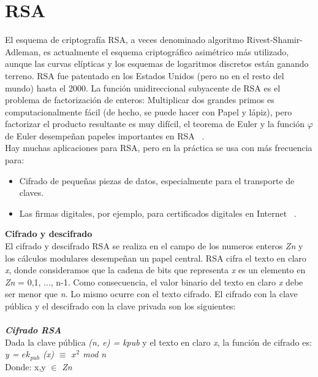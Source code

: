 

\section{RSA}

El esquema de criptografía RSA, a veces denominado algoritmo Rivest-Shamir-Adleman, es actualmente el esquema criptográfico asimétrico más utilizado, aunque las curvas elípticas y los esquemas de logaritmos discretos están ganando terreno. RSA fue patentado en los Estados Unidos (pero no en el resto del mundo) hasta el 2000. La función unidireccional subyacente de RSA es el problema de factorización de enteros: Multiplicar dos grandes primos es computacionalmente fácil (de hecho, se puede hacer con
Papel y lápiz), pero factorizar el producto resultante es muy difícil, el teorema de Euler y la función $\varphi$ de Euler desempeñan papeles importantes en RSA ~\cite{paar}.
\\
Hay muchas aplicaciones para RSA, pero en la práctica se usa con más frecuencia para:

	\begin{itemize}
		\item Cifrado de pequeñas piezas de datos, especialmente para el transporte de claves.
		\item Las firmas digitales, por ejemplo, para certificados digitales en Internet ~\cite{paar}.
	\end{itemize}

\textbf{Cifrado y descifrado} \\
El cifrado y descifrado RSA se realiza en el campo de los numeros enteros \textit{Zn} y los cálculos modulares desempeñan un papel central. RSA cifra el texto en claro \textit{x}, donde consideramos que la cadena de bits que representa \textit{x} es un elemento en \textit{Zn} = {0,1, ..., n-1}. Como consecuencia, el valor binario del texto en claro \textit{x} debe ser menor que \textit{n}. Lo mismo ocurre con el texto cifrado. El cifrado con la clave pública y el descifrado con la clave privada son los siguientes:
\\ \\
\textbf{\textit{Cifrado RSA}}\\ Dada la clave pública \textit{(n, e) = kpub} y el texto en claro \textit{x}, la función de cifrado es:
\\
\textit{ y = $ek_{pub}$ (x) $\equiv$ $x^{2}$ mod n }\\
Donde:  x,y $\in$ \textit{Zn}


